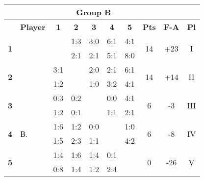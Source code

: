 \documentclass[10pt]{article}
\newcommand{\red}{\color{red}}
\newcommand{\blue}{\color{blue}}
\newcommand{\blank}{\cellcolor[gray]{.5}}
\begin{document}
\begin{tabular}{|c|p{2.8cm}|c|c|c|c|c|c|c|c|}
	\multicolumn{9}{c}{\bf Group B} \\ \hline
	& \bf Player & \bf1 & \bf2 & \bf3 & \bf4 & \bf5 & \bf Pts & \bf F-A & \bf Pl \\ \hline
	\multirow{2}{*}{\bf1}&\multirow{2}{*}{}      & \blank & \blue1:3 & \red3:0 & \red6:1 & \red4:1 &\multirow{2}{*}{14}&\multirow{2}{*}{+23}&\multirow{2}{*}{I} \\ && \blank & \red2:1 & \red2:1 & \red5:1 & \red8:0 &&& \\ \hline
	\multirow{2}{*}{\bf2}&\multirow{2}{*}{}     & \red3:1 & \blank & \red2:0 & \red2:1 & \red6:1 &\multirow{2}{*}{14}&\multirow{2}{*}{+14}&\multirow{2}{*}{II} \\      && \blue1:2 & \blank & \red1:0 & \red3:2 & \red4:1 &&& \\ \hline
	\multirow{2}{*}{\bf3}&\multirow{2}{*}{}     & \blue0:3 & \blue0:2 & \blank & 0:0 & \red4:1 &\multirow{2}{*}{6}&\multirow{2}{*}{-3}&\multirow{2}{*}{III} \\     && \blue1:2 & \blue0:1 & \blank & 1:1 & \red2:1 &&& \\ \hline
	\multirow{2}{*}{\bf4}&\multirow{2}{*}{ В.}     & \blue1:6 & \blue1:2 & 0:0 & \blank & \red1:0 &\multirow{2}{*}{6}&\multirow{2}{*}{-8}&\multirow{2}{*}{IV} \\     && \blue1:5 & \blue2:3 & 1:1 & \blank & \red4:2 &&& \\ \hline
	\multirow{2}{*}{\bf5}&\multirow{2}{*}{}     & \blue1:4 & \blue1:6 & \blue1:4 & \blue0:1 & \blank &\multirow{2}{*}{0}&\multirow{2}{*}{-26}&\multirow{2}{*}{V} \\     && \blue0:8 & \blue1:4 & \blue1:2 & \blue2:4 & \blank &&& \\ \hline
\end{tabular}
\hspace{-5cm}

\vspace{.5cm}
\end{document}
